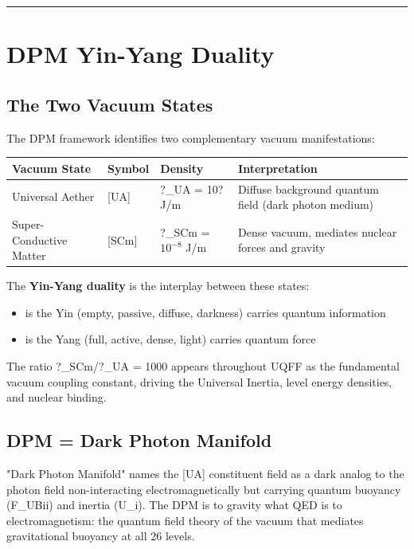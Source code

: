 \documentclass[12pt,a4paper]{article}
\begin{document}
\medskip\hrule\medskip

\section{DPM Yin-Yang Duality}

\subsection{The Two Vacuum States}

The DPM framework identifies two complementary vacuum manifestations:

\begin{table}[H]
\centering
\small
\begin{tabularx}{\linewidth}{@{}>{\raggedright\arraybackslash}X>{\raggedright\arraybackslash}X>{\raggedright\arraybackslash}X>{\raggedright\arraybackslash}X@{}}
\toprule
Vacuum State & Symbol & Density & Interpretation \tabularnewline
\midrule
Universal Aether & {}[UA] & ?\_UA = 10? J/m & Diffuse background quantum field (dark photon medium) \tabularnewline
Super-Conductive Matter & {}[SCm] & ?\_SCm = $10^{-8}$ J/m & Dense vacuum, mediates nuclear forces and gravity \tabularnewline
\bottomrule
\end{tabularx}
\end{table}

The \textbf{Yin-Yang duality} is  the interplay between these states:

\begin{itemize}
  \item [UA] is the Yin (empty, passive, diffuse, darkness)  carries quantum information
  \item [SCm] is the Yang (full, active, dense, light)  carries quantum force
\end{itemize}

The ratio ?\_SCm/?\_UA = 1000 appears throughout UQFF as the fundamental vacuum coupling constant, driving the Universal Inertia, level energy densities, and nuclear binding.

\subsection{DPM = Dark Photon Manifold}

"Dark Photon Manifold" names the [UA] constituent field as a dark analog to the photon field non-interacting electromagnetically but carrying quantum buoyancy (F\_UBii) and inertia (U\_i). The DPM is to gravity what QED is to electromagnetism: the quantum field theory of the vacuum that mediates gravitational buoyancy at all 26 levels.
\end{document}
